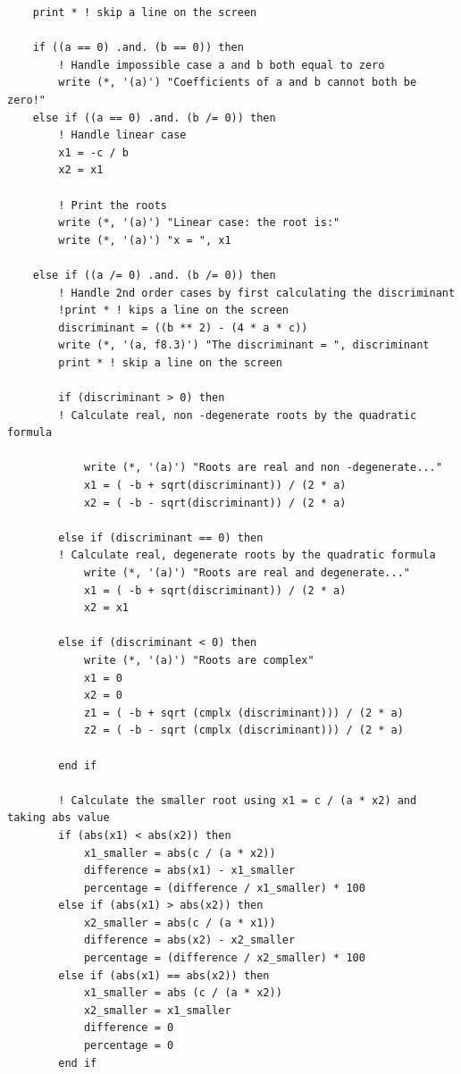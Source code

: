 \begin{verbatim}
    print * ! skip a line on the screen

    if ((a == 0) .and. (b == 0)) then
        ! Handle impossible case a and b both equal to zero
        write (*, '(a)') "Coefficients of a and b cannot both be zero!"
    else if ((a == 0) .and. (b /= 0)) then
        ! Handle linear case
        x1 = -c / b
        x2 = x1

        ! Print the roots
        write (*, '(a)') "Linear case: the root is:"
        write (*, '(a)') "x = ", x1

    else if ((a /= 0) .and. (b /= 0)) then
        ! Handle 2nd order cases by first calculating the discriminant
        !print * ! kips a line on the screen
        discriminant = ((b ** 2) - (4 * a * c))
        write (*, '(a, f8.3)') "The discriminant = ", discriminant
        print * ! skip a line on the screen

        if (discriminant > 0) then
        ! Calculate real, non -degenerate roots by the quadratic formula

            write (*, '(a)') "Roots are real and non -degenerate..."
            x1 = ( -b + sqrt(discriminant)) / (2 * a)
            x2 = ( -b - sqrt(discriminant)) / (2 * a)
        
        else if (discriminant == 0) then
        ! Calculate real, degenerate roots by the quadratic formula
            write (*, '(a)') "Roots are real and degenerate..."
            x1 = ( -b + sqrt(discriminant)) / (2 * a)
            x2 = x1

        else if (discriminant < 0) then
            write (*, '(a)') "Roots are complex"
            x1 = 0
            x2 = 0
            z1 = ( -b + sqrt (cmplx (discriminant))) / (2 * a)
            z2 = ( -b - sqrt (cmplx (discriminant))) / (2 * a)

        end if

        ! Calculate the smaller root using x1 = c / (a * x2) and taking abs value
        if (abs(x1) < abs(x2)) then
            x1_smaller = abs(c / (a * x2))
            difference = abs(x1) - x1_smaller
            percentage = (difference / x1_smaller) * 100
        else if (abs(x1) > abs(x2)) then
            x2_smaller = abs(c / (a * x1))
            difference = abs(x2) - x2_smaller
            percentage = (difference / x2_smaller) * 100
        else if (abs(x1) == abs(x2)) then
            x1_smaller = abs (c / (a * x2))
            x2_smaller = x1_smaller
            difference = 0
            percentage = 0
        end if


\end{verbatim}
